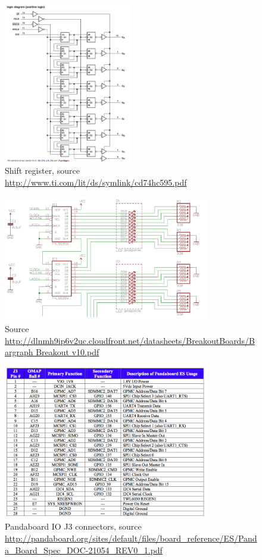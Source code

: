 \begin{figure}[H]
   \centering
   \includegraphics[width=0.5\textwidth]{img/Shift_register.png}%
   \caption{Shift register, source \url{http://www.ti.com/lit/ds/symlink/cd74hc595.pdf}}
   \label{fig:shiftRegister}%
\end{figure}


\begin{figure}[H]
   \centering
   \includegraphics[width=0.8\textwidth]{img/Breakout.png}%
   \caption{Source \url{http://dlnmh9ip6v2uc.cloudfront.net/datasheets/BreakoutBoards/Bargraph Breakout v10.pdf}}
   \label{fig:breakout}%
\end{figure}


\begin{figure}[H]
   \centering
   \includegraphics[width=0.8\textwidth]{img/PandaBoard_IO_J3.png}%
   \caption{Pandaboard IO J3 connectors,  source  \url{http://pandaboard.org/sites/default/files/board_reference/ES/Panda_Board_Spec_DOC-21054_REV0_1.pdf}}
   \label{fig:pandaBoardIOJ3}%
\end{figure}

